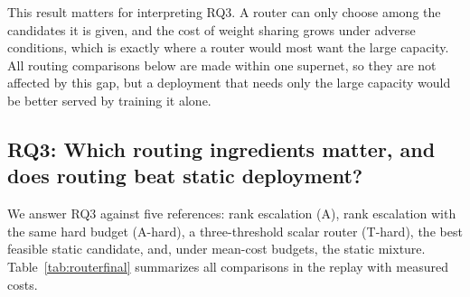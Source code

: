 \documentclass[a4paper,5p]{elsarticle}
\begin{document}
This result matters for interpreting RQ3. A router can only choose among the candidates it is given, and the cost of weight sharing grows under adverse conditions, which is exactly where a router would most want the large capacity. All routing comparisons below are made within one supernet, so they are not affected by this gap, but a deployment that needs only the large capacity would be better served by training it alone.

\subsection{RQ3: Which routing ingredients matter, and does routing beat static deployment?}
\label{sec:rq3}

We answer RQ3 against five references: rank escalation (A), rank escalation with the same hard budget (A-hard), a three-threshold scalar router (T-hard), the best feasible static candidate, and, under mean-cost budgets, the static mixture. Table~\ref{tab:routerfinal} summarizes all comparisons in the replay with measured costs.
\end{document}
